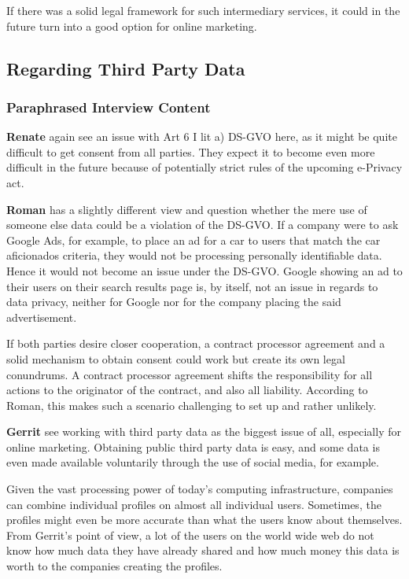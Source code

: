 If there was a solid legal framework for such intermediary services, it could in the future turn into a good option for online marketing.

\subsection{Regarding Third Party Data}

\subsubsection{Paraphrased Interview Content}

\textbf{Renate} again see an issue with Art 6 I lit a) DS-GVO here, as it might be quite difficult to get consent from all parties. They expect it to become even more difficult in the future because of potentially strict rules of the upcoming e-Privacy act.

\textbf{Roman} has a slightly different view and question whether the mere use of someone else data could be a violation of the DS-GVO. If a company were to ask Google Ads, for example, to place an ad for a car to users that match the car aficionados criteria, they would not be processing personally identifiable data. Hence it would not become an issue under the DS-GVO. Google showing an ad to their users on their search results page is, by itself, not an issue in regards to data privacy, neither for Google nor for the company placing the said advertisement.

If both parties desire closer cooperation, a contract processor agreement and a solid mechanism to obtain consent could work but create its own legal conundrums. A contract processor agreement shifts the responsibility for all actions to the originator of the contract, and also all liability. According to Roman, this makes such a scenario challenging to set up and rather unlikely.

\textbf{Gerrit} see working with third party data as the biggest issue of all, especially for online marketing. Obtaining public third party data is easy, and some data is even made available voluntarily through the use of social media, for example.

Given the vast processing power of today's computing infrastructure, companies can combine individual profiles on almost all individual users. Sometimes, the profiles might even be more accurate than what the users know about themselves. From Gerrit's point of view, a lot of the users on the world wide web do not know how much data they have already shared and how much money this data is worth to the companies creating the profiles.

